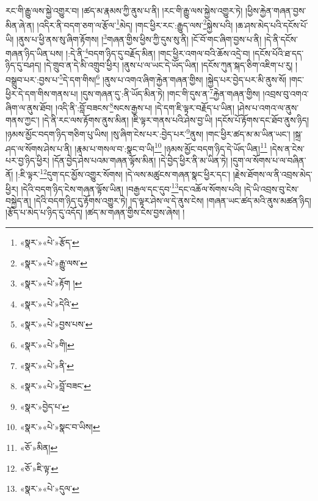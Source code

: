རང་གི་རྒྱུ་ལས་སྐྱེ་འགྱུར་བ། །ཚད་མ་རྣམས་ཀྱི་ནུས་པ་ནི། །རང་གི་རྒྱུ་ལས་སྐྱེས་འགྱུར་ཏེ། །ཕྱིས་རྐྱེན་གཞན་བྱས་མིན་ཞེ་ན། །འདིར་ནི་བདག་ཅག་ལ་རྩོལ་\footnote{«སྣར་»«པེ་»རྩོད་}མེད། །གང་ཕྱིར་རང་:རྒྱུད་ལས་\footnote{«སྣར་»«པེ་»རྒྱུ་ལས་}སྐྱེས་པའི། །ཆ་ཤས་མེད་པའི་དངོས་པོ་ཡི། །ནུས་པ་ཕྱི་ནས་སུ་ཞིག་རྟོགས། །\footnote{«སྣར་»«པེ་»རྟོག །}གཞན་གྱིས་ཕྱིས་ཀྱི་དུས་སུ་ནི། །ངོ་བོ་གང་ཞིག་བྱས་པ་ནི། །དེ་ནི་དངོས་གཞན་ཉིད་ཡིན་པས། །:དེ་ནི་\footnote{«སྣར་»«པེ་»དེའི་}བདག་ཉིད་དུ་བརྗོད་མིན། །གང་ཕྱིར་འགལ་བའི་ཆོས་འདྲེ་བ། །དངོས་པོའི་ཐ་དད་ཉིད་དུ་བཤད། །དེ་གྲུབ་ན་དེ་མི་འགྲུབ་ཕྱིར། །ནུས་པ་ལ་ཡང་དེ་ཡོད་ཡིན། །དངོས་ཀུན་སྐད་ཅིག་འཇིག་པ་རུ། །བསྒྲུབ་པར་:བྱས་པ་\footnote{«སྣར་»«པེ་»བྱས་པས་}དེ་དག་གིས།\footnote{«སྣར་»«པེ་»གི།} །ནུས་པ་འགའ་ཞིག་རྐྱེན་གཞན་གྱིས། །སྐྱེད་པར་བྱེད་པར་མི་ནུས་སོ། །གང་ཕྱིར་དེ་དག་གིས་གནས་པ། །དུས་གཞན་དུ་:ནི་ཡོད་མིན་ཏེ། །གང་གི་དུས་ན་\footnote{«སྣར་»«པེ་»ནི་}རྐྱེན་གཞན་གྱིས། །འབྲས་བུ་འགའ་ཞིག་ལ་ནུས་ཐོབ། །འདི་ནི་:བློ་བཟངས་\footnote{«སྣར་»«པེ་»བློ་བཟང་}སངས་རྒྱས་པ། །དེ་དག་ཇི་ལྟར་བརྗོད་པ་ཡིན། །ཤེས་པ་འགའ་ལ་ནུས་གནས་ཀྱང་། །དེ་ནི་རང་ལས་རྟོགས་ནུས་མིན། །ཇི་ལྟར་གནས་པའི་ཤེས་བྱ་ཡི། །དངོས་པོ་རྟོགས་དང་ཐོབ་ནུས་ཉིད། །ཉམས་མྱོང་བདག་ཉིད་གཅིག་པུ་ཡིས། །སུ་ཞིག་ངེས་པར་:བྱེད་པར་\footnote{«སྣར་»བྱེད་པ་}ནུས། །གང་ཕྱིར་ཚད་མ་མ་ཡིན་ཡང་། །སྐྲ་ཤད་ལ་སོགས་ཤེས་པ་ནི། །རྣམ་པ་གསལ་བ་:སྣང་བ་ཡི།\footnote{«སྣར་»«པེ་»སྣང་བ་ཡིས།} །ཉམས་མྱོང་བདག་ཉིད་དེ་ཡོད་ཡིན།\footnote{«ཅོ་»མིན།} །དེས་ན་ངེས་པར་བྱ་ཉིད་ཕྱིར། །དོན་བྱེད་ཤེས་པའམ་གཞན་ལྟོས་མིན། །དེ་བྱེད་ཕྱིར་ནི་མ་ཡིན་ཏེ། །དུག་ལ་སོགས་པ་ལ་བཞིན་ནོ། །:ཇི་ལྟར་\footnote{«ཅོ་»ཇི་ལྟ་}དུག་དང་མྱོས་འགྱུར་སོགས། །དེ་ལས་མཚུངས་གཞན་སྣང་ཕྱིར་དང་། །རྗེས་ཐོགས་ལ་ནི་འབྲས་མེད་ཕྱིར། །དེའི་བདག་ཉིད་ངེས་གཞན་ལྟོས་ཡིན། །བརྒྱལ་དང་དུབ་\footnote{«སྣར་»«པེ་»དུལ་}དང་འཆོལ་སོགས་པའི། །དེ་ཡི་འབྲས་བུ་ངེས་བསྐྱེད་ན། །དེའི་བདག་ཉིད་དུ་རྟོགས་འགྱུར་ཏེ། །ད་ལྟར་ཤེས་ལ་དེ་ནུས་ངེས། །གཞན་ཡང་ཚད་མའི་ནུས་མཚན་ཉིད། །རྩོད་པ་མེད་པ་ཉིད་དུ་འདོད། །ཚད་མ་གཞན་གྱིས་ངེས་བྱས་ཞེས། །
